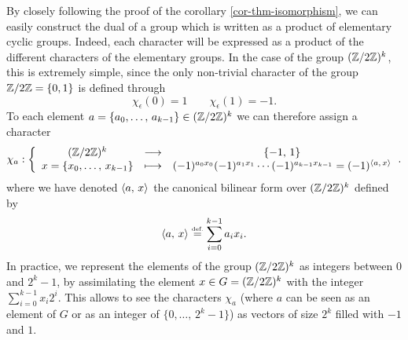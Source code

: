  
By closely following the proof of the corollary \ref{cor-thm-isomorphism}, we can easily construct the dual of a group which is written as a product of elementary cyclic groups. Indeed, each character will be expressed as a product of the different characters of the elementary groups. In the case of the group $ (\mathbb{Z}/2 \mathbb{Z})^k $, this is extremely simple, since the only non-trivial character of the group $ \mathbb{Z}/2 \mathbb{Z} = \{0,1\} $ is defined through
\begin{equation*}
\chi_{\epsilon} (0) = 1 \quad \quad \chi_{\epsilon} (1) = -1.
\end{equation*}
To each element $ a = \{a_0, \ldots, \, a_{k-1}\} \in (\mathbb{Z}/2 \mathbb{Z})^k $ we can therefore assign a character
\begin{equation}
\label{eq-denf-base-walsh}
\chi_a: {\left\{ \begin{array}{ccc} (\mathbb{Z}/2 \mathbb{Z})^k & \longrightarrow & \{- 1, \, 1\} \\ x = \{x_0, \ldots, \, x_{k-1}\} & \longmapsto & (-1)^{a_0 x_0} (-1)^{a_1 x_1} \cdots (-1)^{a_{k-1} x_{k-1}} = (-1)^{\langle a,\,x\rangle} \end{array} \right.}.
\end{equation}
where we have denoted $ \langle a,\,x\rangle $ the canonical bilinear form over $ (\mathbb{Z}/2 \mathbb{Z})^k $ defined by
\begin{equation*}
\langle a,\,x\rangle \stackrel{\mbox{\upshape\tiny def.}}{=} \sum_{i = 0}^{k-1}{a_i x_i}.
\end{equation*}
In practice, we represent the elements of the group $ (\mathbb{Z}/2 \mathbb{Z})^k $ as integers between $ 0 $ and $ 2^k-1 $, by assimilating the element $ x \in G = (\mathbb{Z}/2 \mathbb{Z})^k $ with the integer $ \sum_{i = 0}^{k-1}{x_i 2^i} $. This allows to see the characters $ \chi_a $ (where $ a $ can be seen as an element of $ G $ or as an integer of $ \{0, \ldots, \, 2^k-1\} $) as vectors of size $ 2^k $ filled with $ -1 $ and $ 1 $.
 
